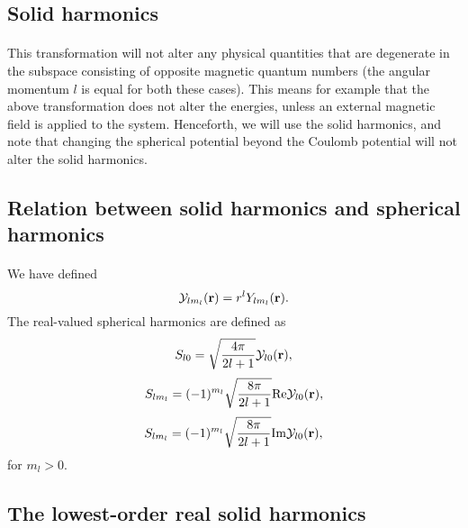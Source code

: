 \documentclass[%
twoside,                 %
final,                   %
10pt]{article}
\begin{document}
\subsection*{Solid harmonics}

\paragraph{}
This transformation will not alter any physical quantities that are
degenerate in the subspace consisting of opposite magnetic quantum
numbers (the angular momentum $l$ is equal for both these cases). This
means for example that the above transformation does not alter the
energies, unless an external magnetic field is applied to the
system. Henceforth, we will use the solid harmonics, and note that
changing the spherical potential beyond the Coulomb potential will not
alter the solid harmonics.


\subsection*{Relation between solid harmonics and spherical harmonics}

\paragraph{}
We have defined 
\[
  {\cal Y}_{lm_l}(\mathbf{r}) = r^l Y_{lm_l}(\mathbf{r}).
\]
The real-valued spherical harmonics are defined as
\[
S_{l0} =  \sqrt{\frac{4\pi}{2l+1}} {\cal Y}_{l0}(\mathbf{r}),
\]
\[
S_{lm_l} =  (-1)^{m_l}\sqrt{\frac{8\pi}{2l+1}} \mathrm{Re}{\cal Y}_{l0}(\mathbf{r}),
\]
\[
S_{lm_l} =  (-1)^{m_l}\sqrt{\frac{8\pi}{2l+1}} \mathrm{Im}{\cal Y}_{l0}(\mathbf{r}),
\]
for $m_l> 0$.



\subsection*{The lowest-order real solid harmonics}

\paragraph{}
\end{document}
